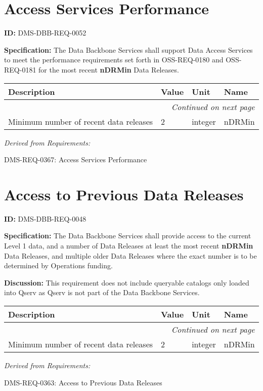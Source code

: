 \documentclass[SE,toc,lsstdraft]{lsstdoc}
\date{2018-06-21}
\makeatletter
\newcommand{\paramname}[1]{\hspace{0pt}#1}
\newcommand{\unitname}[1]{\hspace{0pt}#1}
\newenvironment{parameters}[0]{%
\setlength\LTleft{0pt}
\setlength\LTright{\fill}
\begin{small}
\begin{longtable}[]{|p{0.49\textwidth}|l|p{0.6in}|p{1.70in}@{}|}

\hline \textbf{Description} & \textbf{Value} & \textbf{Unit} & \textbf{Name} \\ \hline
\endhead

\hline \multicolumn{4}{r}{\emph{Continued on next page}} \\
\endfoot

\hline\hline
\endlastfoot
}{%
\hline
\end{longtable}
\end{small}
}
\makeatother
\begin{document}
\maketitle

\section{Access Services Performance}

\label{DMS-DBB-REQ-0052}
\textbf{ID:} DMS-DBB-REQ-0052

\textbf{Specification:}
The Data Backbone Services shall support Data Access Services to meet the performance requirements set forth in OSS-REQ-0180 and OSS-REQ-0181 for the most recent \textbf{nDRMin} Data Releases.

\begin{parameters}
Minimum number of recent data releases
&
2
&
\unitname{%
integer
}
&
\paramname{%
nDRMin
} \\\hline
\end{parameters}

\emph{Derived from Requirements:}

DMS-REQ-0367:
Access Services Performance \newline

\section{Access to Previous Data Releases}

\label{DMS-DBB-REQ-0048}
\textbf{ID:} DMS-DBB-REQ-0048

\textbf{Specification:}
The Data Backbone Services shall provide access to the current Level 1 data, and a number of Data Releases at least the most recent \textbf{nDRMin} Data Releases, and multiple older Data Releases where the exact number is to be determined by Operations funding.

\textbf{Discussion:}
This requirement does not include queryable catalogs only loaded into Qserv as Qserv is not part of the Data Backbone Services.

\begin{parameters}
Minimum number of recent data releases
&
2
&
\unitname{%
integer
}
&
\paramname{%
nDRMin
} \\\hline
\end{parameters}

\emph{Derived from Requirements:}

DMS-REQ-0363:
Access to Previous Data Releases \newline
\end{document}
